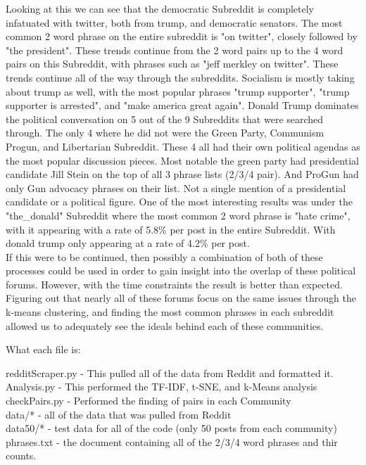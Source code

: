 \documentclass{article}
\begin{document}
\begin{addmargin}[4em]{4em}
Looking at this we can see that the democratic Subreddit is completely infatuated with twitter, both from trump, and democratic senators. The most common 2 word phrase on the entire subreddit is "on twitter", closely followed by "the president". These trends continue from the 2 word pairs up to the 4 word pairs on this Subreddit, with phrases such as "jeff merkley on twitter". These trends continue all of the way through the subreddits. Socialism is mostly taking about trump as well, with the most popular phrases "trump supporter", "trump supporter is arrested", and "make america great again". Donald Trump dominates the political conversation on 5 out of the 9 Subreddits that were searched through. The only 4 where he did not were the Green Party, Communism Progun, and Libertarian Subreddit. These 4 all had their own political agendas as the most popular discussion pieces. Most notable the green party had presidential candidate Jill Stein on the top of all 3 phrase lists (2/3/4 pair). And ProGun had only Gun advocacy phrases on their list. Not a single mention of a presidential candidate or a political figure. One of the most interesting results was under the "the\_donald" Subreddit where the most common 2 word phrase is "hate crime", with it appearing with a rate of 5.8\% per post in the entire Subreddit. With donald trump only appearing at a rate of 4.2\% per post.\\
If this were to be continued, then possibly a combination of both of these processes could be used in order to gain insight into the overlap of these political forums. However, with the time constraints the result is better than expected. Figuring out that nearly all of these forums focus on the same issues through the k-means clustering, and finding the most common phrases in each subreddit allowed us to adequately see the ideals behind each of these communities.

\end{addmargin}


What each file is:
\begin{addmargin}[4em]{4em}
redditScraper.py - This pulled all of the data from Reddit and formatted it.\\
Analysis.py - This performed the TF-IDF, t-SNE, and k-Means analysis\\
checkPairs.py - Performed the finding of pairs in each Community \\
data/* - all of the data that was pulled from Reddit\\
data50/* - test data for all of the code (only 50 posts from each community)\\
phrases.txt - the document containing all of the 2/3/4 word phrases and thir counts.
\end{addmargin}
\end{document}
